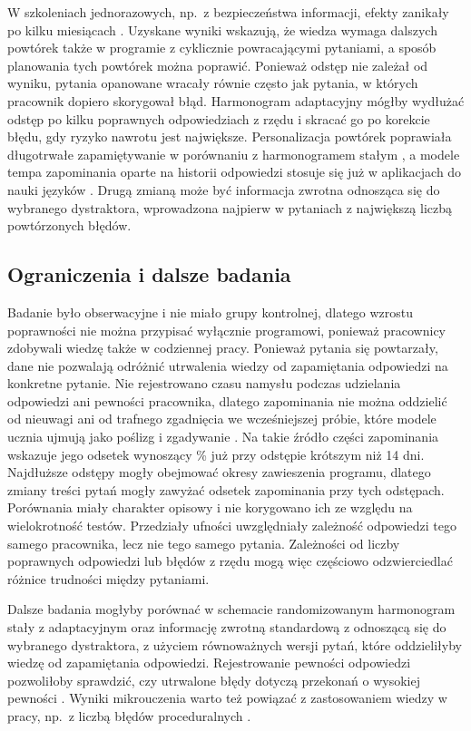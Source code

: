 W szkoleniach jednorazowych, np.\ z bezpieczeństwa informacji, efekty zanikały po kilku miesiącach
\citep{reinheimer2020}. Uzyskane wyniki wskazują, że wiedza wymaga dalszych powtórek także w programie
z cyklicznie powracającymi pytaniami, a sposób planowania tych powtórek można poprawić. Ponieważ odstęp
nie zależał od wyniku, pytania opanowane wracały równie często jak pytania, w których pracownik dopiero
skorygował błąd. Harmonogram adaptacyjny mógłby wydłużać odstęp po kilku poprawnych odpowiedziach
z rzędu i skracać go po korekcie błędu, gdy ryzyko nawrotu jest największe. Personalizacja powtórek
poprawiała długotrwałe zapamiętywanie w porównaniu z harmonogramem stałym \citep{lindsey2014}, a modele
tempa zapominania oparte na historii odpowiedzi stosuje się już w aplikacjach do nauki języków
\citep{settles2016}. Drugą zmianą może być informacja zwrotna odnosząca się do wybranego dystraktora,
wprowadzona najpierw w pytaniach z największą liczbą powtórzonych błędów.

\subsection{Ograniczenia i dalsze badania}
Badanie było obserwacyjne i nie miało grupy kontrolnej, dlatego wzrostu poprawności nie można przypisać
wyłącznie programowi, ponieważ pracownicy zdobywali wiedzę także w codziennej pracy. Ponieważ pytania
się powtarzały, dane nie pozwalają odróżnić utrwalenia wiedzy od zapamiętania odpowiedzi na konkretne
pytanie. Nie rejestrowano czasu namysłu podczas udzielania odpowiedzi ani pewności pracownika, dlatego zapominania
nie można oddzielić od nieuwagi ani od trafnego zgadnięcia we wcześniejszej próbie, które modele ucznia
ujmują jako poślizg i zgadywanie \citep{corbett1994}. Na takie źródło części zapominania wskazuje jego
odsetek wynoszący \ForgetShort\% już przy odstępie krótszym niż 14 dni. Najdłuższe odstępy mogły
obejmować okresy zawieszenia programu, dlatego zmiany treści pytań mogły zawyżać odsetek zapominania
przy tych odstępach. Porównania miały charakter opisowy i nie korygowano ich ze względu na
wielokrotność testów. Przedziały ufności uwzględniały zależność odpowiedzi tego samego pracownika,
lecz nie tego samego pytania. Zależności od liczby poprawnych odpowiedzi lub błędów z rzędu mogą więc
częściowo odzwierciedlać różnice trudności między pytaniami.

Dalsze badania mogłyby porównać w schemacie randomizowanym harmonogram stały z adaptacyjnym oraz
informację zwrotną standardową z odnoszącą się do wybranego dystraktora, z użyciem równoważnych wersji
pytań, które oddzieliłyby wiedzę od zapamiętania odpowiedzi. Rejestrowanie pewności odpowiedzi
pozwoliłoby sprawdzić, czy utrwalone błędy dotyczą przekonań o wysokiej pewności \citep{butler2011}.
Wyniki mikrouczenia warto też powiązać z zastosowaniem wiedzy w pracy, np.\ z liczbą błędów
proceduralnych \citep{blume2010}.

